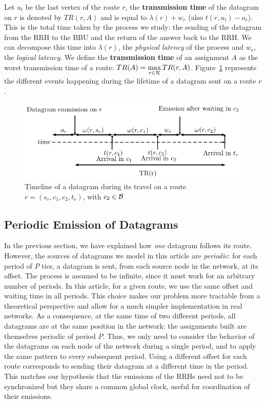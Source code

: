 \documentclass[a4paper,10pt]{journal}
\begin{document}
 		 Let $u_l$ be the last vertex of the route $r$, the \textbf{transmission time} of the datagram on 
  		$r$ is denoted by $TR(r,A)$ and is equal to $\lambda(r) + w_r$ (also $t(r,u_l) - o_r$). This is the total time taken by the process we study: the sending of the datagram from the RRH to the BBU and the return of the answer back to the RRH. We can decompose this time into $\lambda(r)$, the \emph{physical latency} of the process and $w_r$, the \emph{logical latency}. 
  		We define the \textbf{transmission time} of an assignment $A$ as the worst transmission time of a route: $TR(A) = \displaystyle \max\limits_{r \in {\cal R}} TR(r,A)$. 
        Figure~\ref{fig:datagramtimeline} represents the different events happening during the lifetime  of a datagram  sent on a route $r$.
  		\begin{figure}
  		 \begin{center}
      \includegraphics[width=\textwidth]{time.pdf}
      \end{center}
      \caption{Timeline of a datagram during its travel on a route $r = (s_r,c_1,c_2,t_r)$, with $c_2 \in \cal{B}$}
      \label{fig:datagramtimeline}
  		\end{figure}




 	\subsection{Periodic Emission of Datagrams}

	In the previous section, we have explained how \emph{one} datagram follows its route.
	However, the sources of datagrams we model in this article are \emph{periodic}: for each period of $P$ tics, a datagram is sent, from each source node in the network, at its offset. The process is assumed to be infinite, since it must work for an arbitrary number of periods. In this article, for a given route, we use the same offset and waiting time in all periods. This choice makes our problem more tractable from a theoretical perspective and allow for a much simpler implementation in real networks. As a consequence, at the same time of two different periods, all datagrams are at the same position in the network: the assignments built are themselves periodic of period $P$. Thus, we only need to consider the behavior of the datagrams on each node of the network during a single period, and to apply the same pattern to every subsequent period. 
 	Using a different offset for each route corresponds to sending their datagram at a different time in the period. This matches our hypothesis that the emissions of the RRHs need not to be synchronized but they share a common global clock, useful for coordination of their emissions.
\end{document}
